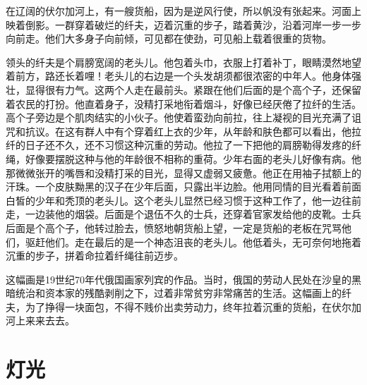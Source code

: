 \documentclass[12pt,UTF-8,openany]{ctexbook}
\begin{document}
\begin{large}
    
    在辽阔的伏尔加河上，有一艘货船，因为是逆风行使，所以帆没有张起来。河面上映着倒影。一群穿着破烂的纤夫，迈着沉重的步子，踏着黄沙，沿着河岸一步一步向前走。他们大多身子向前倾，可见都在使劲，可见船上载着很重的货物。
    
    领头的纤夫是个肩膀宽阔的老头儿。他包着头巾，衣服上打着补丁，眼睛漠然地望着前方，路还长着哩！老头儿的右边是一个头发胡须都很浓密的中年人。他身体强壮，显得很有力气。这两个人走在最前头。紧跟在他们后面的是个高个子，还保留着农民的打扮。他直着身子，没精打采地衔着烟斗，好像已经厌倦了拉纤的生活。高个子旁边是个肌肉结实的小伙子。他使着蛮劲向前拉，往上凝视的目光充满了诅咒和抗议。在这有群人中有个穿着红上衣的少年，从年龄和肤色都可以看出，他拉纤的日子还不久，还不习惯这种沉重的劳动。他拉了一下把他的肩膀勒得发疼的纤绳，好像要摆脱这种与他的年龄很不相称的重荷。少年右面的老头儿好像有病。他那微微张开的嘴唇和没精打采的目光，显得又虚弱又疲惫。他正在用袖子拭额上的汗珠。一个皮肤黝黑的汉子在少年后面，只露出半边脸。他用同情的目光看着前面白皙的少年和秃顶的老头儿。这个老头儿显然已经习惯于这种工作了，他一边往前走，一边装他的烟袋。后面是个退伍不久的士兵，还穿着官家发给他的皮靴。士兵后面是个高个子，他转过脸去，愤怒地朝货船上望，一定是货船的老板在咒骂他们，驱赶他们。走在最后的是一个神态沮丧的老头儿。他低着头，无可奈何地拖着沉重的步子，拼着命拉着纤绳往前迈步。
    
    这幅画是19世纪70年代俄国画家列宾的作品。当时，俄国的劳动人民处在沙皇的黑暗统治和资本家的残酷剥削之下，过着非常贫穷非常痛苦的生活。这幅画上的纤夫，为了挣得一块面包，不得不贱价出卖劳动力，终年拉着沉重的货船，在伏尔加河上来来去去。
    
\end{large}



\chapter{灯光}
\end{document}
